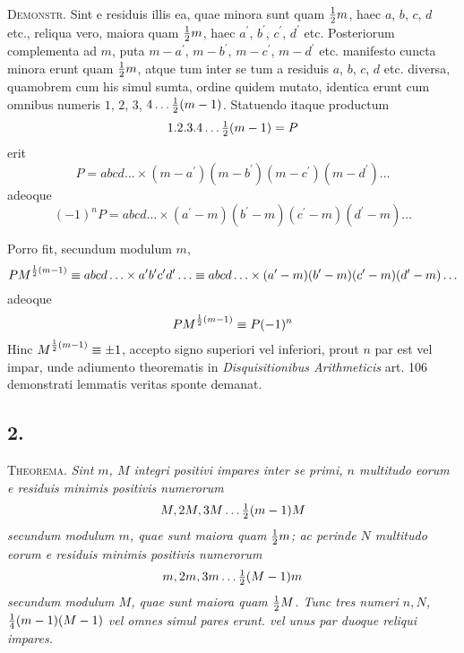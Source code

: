 \documentclass[twoside,12pt]{memoir}
\let\oldfrac\frac
\def\frac#1#2{\mathchoice{\tfrac{#1}{#2}}{\oldfrac{#1}{#2}}{\genfrac{}{}{}{2}{#1}{#2\mathstrut}}{\genfrac{}{}{}{3}{#1}{#2\mathstrut}}}
\begin{document}
\textsc{Demonstr.} Sint e residuis illis ea, quae minora sunt quam \(\frac{1}{2} m\), haec \(a\), \(b\), \(c\), \(d\) etc., reliqua vero, maiora quam \(\frac{1}{2} m\), haec \(a^{\prime}\), \(b^{\prime}\), \(c^{\prime}\), \(d^{\prime}\) etc. Posteriorum complementa ad \(m\), puta \(m-a^{\prime}\), \(m-b^{\prime}\), \(m-c^{\prime}\), \(m-d^{\prime}\) etc. manifesto cuncta minora erunt quam \(\frac{1}{2} m\), atque tum inter se tum a residuis \(a\), \(b\), \(c\), \(d\) etc. diversa, quamobrem cum his simul sumta, ordine quidem mutato, identica erunt cum omnibus numeris \(1\), \(2\), \(3\), \(4 \ldots \frac{1}{2}(m-1)\). Statuendo itaque productum
\[1. 2 . 3 . 4 \ldots \frac{1}{2}(m-1)=P\]
erit
\[P=a b c d \ldots \times(m-a^{\prime})(m-b^{\prime})(m-c^{\prime})(m-d^{\prime}) \ldots\]
adeoque
\[(-1)^{n} P=a b c d \ldots \times(a^{\prime}-m)(b^{\prime}-m)(c^{\prime}-m)(d^{\prime}-m) \ldots\]

Porro fit, secundum modulum \(m\),
\[P M^{\frac{1}{2}(m-1)} \equiv a b c d \ldots \times a^{\prime} b^{\prime} c^{\prime} d^{\prime} \ldots \equiv a b c d \ldots \times(a^{\prime}-m)(b^{\prime}-m)(c^{\prime}-m)(d^{\prime}-m) \ldots\]
adeoque
\[P M^{\frac{1}{2}(m-1)} \equiv P(-1)^{n}\]
Hinc \(M^{\frac{1}{2}(m-1)} \equiv \pm 1\), accepto signo superiori vel inferiori, prout \(n\) par est vel impar, unde adiumento theorematis in \textit{Disquisitionibus Arithmeticis} art. 106 demonstrati lemmatis veritas sponte demanat.\pagebreak%

\subsection*{2.}
 
\textsc{Theorema.} \textit{Sint \(m\), \(M\) integri positivi impares inter se primi, \(n\) multitudo eorum e residuis minimis positivis numerorum}
\[M, 2 M, 3 M \ldots  \frac{1}{2}(m-1) M\]
\textit{secundum modulum \(m\), quae sunt maiora quam \(\frac{1}{2} m\); ac perinde \(N\) multitudo eorum e residuis minimis positivis numerorum}
\[m, 2 m, 3 m \ldots \frac{1}{2}(M-1) m\]
\textit{secundum modulum \(M\), quae sunt maiora quam \(\frac{1}{2} M\). Tunc tres numeri \(n, N\), \(\frac{1}{4}(m-1)(M-1)\) vel omnes simul pares erunt. vel unus par duoque reliqui impares.}
 
\end{document}
